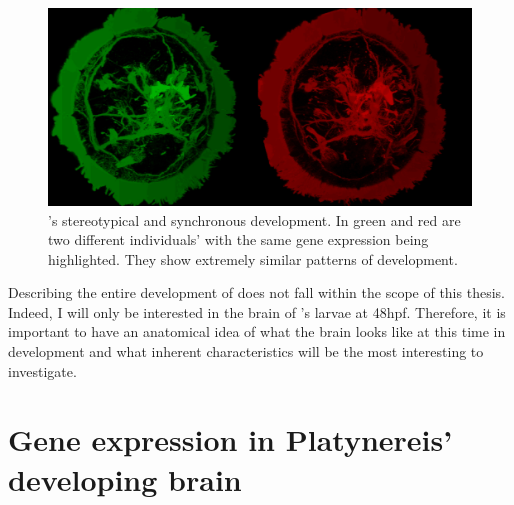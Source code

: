 \begin{figure}[bth]
  \includegraphics[width=\linewidth]{gfx/chapter1/brain_comparison.png}
  \caption{\platyfull{}'s stereotypical and synchronous development. In green and red are two different \platy{} individuals' with the same gene expression being highlighted. They show extremely similar patterns of development.}
  \label{fig:brain_comparison}
\end{figure}

	 Describing the entire development of \platy{} does not fall within the scope of this thesis. Indeed, I will only be interested in the brain of \platy{}'s larvae at 48hpf. Therefore, it is important to have an anatomical idea of what the brain looks like at this time in development and what inherent characteristics will be the most interesting to investigate.

\section{Gene expression in Platynereis' developing brain}\label{sec:gene_expression_background}
